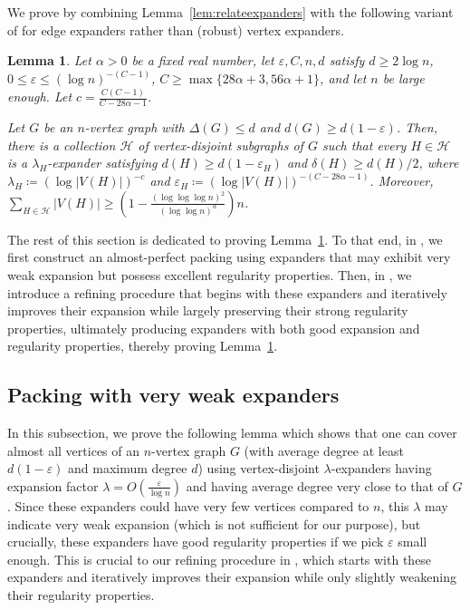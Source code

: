 \documentclass[10pt]{article}
\theoremstyle{plain}
\numberwithin{theorem}{section}
\newtheorem{lemma}[theorem]{Lemma}
\theoremstyle{definition}
\theoremstyle{remark}
\newcommand{\cH}{\mathcal{H}}
\newcommand{\eps}{\varepsilon}
\theoremstyle{plain}
\begin{document}
We prove  by combining Lemma~\ref{lem:relateexpanders} with the following variant of  for edge expanders rather than (robust) vertex expanders.

\begin{lemma}
	\label{lem:expandercoverstrong}
	Let  $\alpha > 0$ be a fixed real number, let $\eps, C, n, d$ satisfy $d \ge 2\log n$, $0 \le \eps \le (\log n)^{-(C-1)}$, $C \ge \max\{28\alpha + 3, 56\alpha + 1\}$, and let $n$ be large enough. Let $c = \frac{C(C-1)}{C-28\alpha-1}$.

	Let $G$ be an $n$-vertex graph with $\Delta(G) \le d$ and $d(G) \ge d(1- \eps)$. Then, there is a collection $\cH$ of vertex-disjoint subgraphs of $G$ such that every $H \in \cH$ is a $\lambda_H$-expander satisfying $d(H) \ge d(1 - \eps_H)$ and $\delta(H) \ge d(H)/2$, where $\lambda_H \coloneqq (\log |V(H)|)^{-c}$ and $\eps_H \coloneqq (\log |V(H)|)^{-(C-28 \alpha - 1)}$. Moreover, $\sum_{H \in \cH} |V(H)| \ge (1 - \frac{(\log \log \log n)^2}{(\log \log n)^{\alpha}})n$. 
\end{lemma}

The rest of this section is dedicated to proving Lemma~\ref{lem:expandercoverstrong}. 
To that end, in , we first construct an almost-perfect packing using expanders that may exhibit very weak expansion but possess excellent regularity properties. Then, in , we introduce a refining procedure that begins with these expanders and iteratively improves their expansion while largely preserving their strong regularity properties, ultimately producing expanders with both good expansion and regularity properties, thereby proving Lemma~\ref{lem:expandercoverstrong}.

\subsection{Packing with very weak expanders}
\label{subsec:weakexpanderpacking}

In this subsection, we prove the following lemma which shows that one can cover almost all vertices of an $n$-vertex graph $G$ (with average degree at least $d(1 - \eps)$ and maximum degree $d$) using
vertex-disjoint $\lambda$-expanders having expansion factor $\lambda = O(\frac{\eps}{\log n})$ and having average degree very close to that of $G$. Since these expanders could have very few vertices compared to $n$, this $\lambda$ may indicate very weak expansion (which is not sufficient for our purpose), but crucially, these expanders have good regularity properties if we pick $\eps$ small enough. This is crucial to our refining procedure in , which starts with these expanders and iteratively improves their expansion while only slightly weakening their regularity properties.
\end{document}
